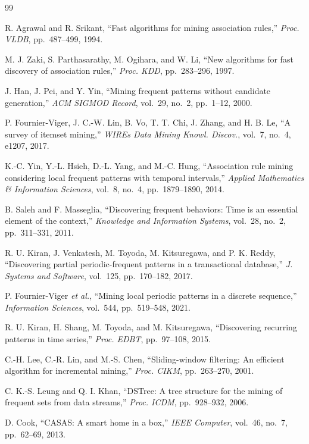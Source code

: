 \documentclass[fleqn,10pt,twocolumn]{AROB}
\begin{document}
\begin{thebibliography}{99}

R. Agrawal and R. Srikant,
``Fast algorithms for mining association rules,''
{\it Proc. VLDB}, pp.~487--499, 1994.

M. J. Zaki, S. Parthasarathy, M. Ogihara, and W. Li,
``New algorithms for fast discovery of association rules,''
{\it Proc. KDD}, pp.~283--296, 1997.

J. Han, J. Pei, and Y. Yin,
``Mining frequent patterns without candidate generation,''
{\it ACM SIGMOD Record}, vol.~29, no.~2, pp.~1--12, 2000.

P. Fournier-Viger, J. C.-W. Lin, B. Vo, T. T. Chi, J. Zhang, and H. B. Le,
``A survey of itemset mining,''
{\it WIREs Data Mining Knowl. Discov.}, vol.~7, no.~4, e1207, 2017.

K.-C. Yin, Y.-L. Hsieh, D.-L. Yang, and M.-C. Hung,
``Association rule mining considering local frequent patterns with temporal intervals,''
{\it Applied Mathematics \& Information Sciences}, vol.~8, no.~4,
pp.~1879--1890, 2014.

B. Saleh and F. Masseglia,
``Discovering frequent behaviors: Time is an essential element of the context,''
{\it Knowledge and Information Systems}, vol.~28, no.~2, pp.~311--331, 2011.

R. U. Kiran, J. Venkatesh, M. Toyoda, M. Kitsuregawa, and P. K. Reddy,
``Discovering partial periodic-frequent patterns in a transactional database,''
{\it J. Systems and Software}, vol.~125, pp.~170--182, 2017.

P. Fournier-Viger {\it et al.},
``Mining local periodic patterns in a discrete sequence,''
{\it Information Sciences}, vol.~544, pp.~519--548, 2021.

R. U. Kiran, H. Shang, M. Toyoda, and M. Kitsuregawa,
``Discovering recurring patterns in time series,''
{\it Proc. EDBT}, pp.~97--108, 2015.

C.-H. Lee, C.-R. Lin, and M.-S. Chen,
``Sliding-window filtering: An efficient algorithm for incremental mining,''
{\it Proc. CIKM}, pp.~263--270, 2001.

C. K.-S. Leung and Q. I. Khan,
``DSTree: A tree structure for the mining of frequent sets from data streams,''
{\it Proc. ICDM}, pp.~928--932, 2006.

D. Cook,
``CASAS: A smart home in a box,''
{\it IEEE Computer}, vol.~46, no.~7, pp.~62--69, 2013.

\end{thebibliography}
\end{document}
